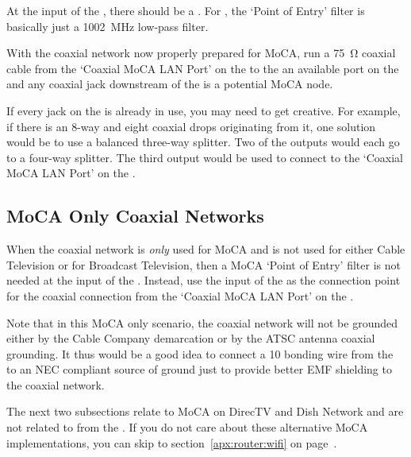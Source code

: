 At the input of the , there should be a
. For \xdband{},
the `Point of Entry' filter is basically just a \SI{1002}{\mega\hertz} low-pass filter.

With the coaxial network now properly prepared for MoCA, run a \SI{75}{\ohm} coaxial cable from the
`Coaxial MoCA LAN Port' on the  to the an available port on the
 and any coaxial jack downstream of the 
is a potential \xdband{} MoCA node.

If every jack on the  is already in use, you may need to get creative. For example,
if there is an 8-way  and eight coaxial drops originating from it, one solution would
be to use a
balanced three-way splitter. Two of the outputs would each go to a
four-way splitter. The third output would be used to connect to the `Coaxial MoCA LAN Port' on the
.


\subsection{MoCA Only Coaxial Networks}

When the coaxial network is \emph{only} used for MoCA and is not used for either Cable Television or for
Broadcast Television, then a MoCA `Point of Entry' filter is not needed at the input of the .
Instead, use the input of the  as the connection point for the coaxial connection from the
`Coaxial MoCA LAN Port' on the .

Note that in this MoCA only scenario, the coaxial network will not be grounded either by the Cable Company
demarcation or by the ATSC antenna coaxial grounding. It thus would be a good idea to connect a \SI{10}{\awg}
bonding wire from the  to an NEC compliant source of ground just to provide better
EMF shielding to the coaxial network.

The next two subsections relate to MoCA on DirecTV and Dish Network and are not related to \xdband{}
from the . If you do not care about these alternative MoCA implementations, you
can skip to section~\ref{apx:router:wifi} on page~\pageref{apx:router:wifi}.

